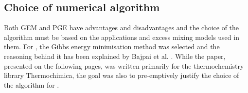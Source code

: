 \subsection{Choice of numerical algorithm}\label{sec:algo_choice}
	Both GEM and PGE have advantages and disadvantages and the choice of the algorithm must be based on the applications and excess mixing models used in them. For {\GEM}, the Gibbs energy minimisation method was selected and the reasoning behind it has been explained by Bajpai et al. \cite{Bajpai:2021ab}. While the paper, presented on the following pages, was written primarily for the thermochemistry library Thermochimica, the goal was also to pre-emptively justify the choice of the algorithm for {\GEM}. 
	
	 

